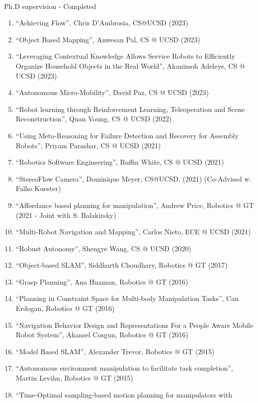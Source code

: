 \documentclass{article}
\begin{document}
\begin{cv}
\begin{cvlist}{~}
\item[Ph.D supervision - Completed]\ \\
  \begin{enumerate}
    \item ``Achieving Flow'', Chris D'Ambrosia, CS@UCSD (2023)
    \item ``Object Based Mapping'', Anwesan Pal, CS @ UCSD (2023)
    \item ``Leveraging Contextual Knowledge Allows Service Robots to
          Efficiently Organize Household Objects in the Real World'', Akanimoh Adeleye, CS @ UCSD (2023)
    \item ``Autonomous Micro-Mobility'', David Paz, CS @ UCSD (2023)
    \item ``Robot learning through Reinforcement Learning, Teleoperation
        and Scene Reconstruction'', Quan Voung, CS @ UCSD (2022)
    \item ``Using Meta-Reasoning for Failure Detection and Recovery for
          Assembly Robots'', Priyam Parashar, CS @ UCSD (2021)
    \item ``Robotics Software Engineering'', Ruffin White, CS @ UCSD (2021)
    \item ``StereoFlow Camera'', Dominique Meyer, CS@UCSD, (2021)
          (Co-Advised w. Falko Kuester)
    \item ``Affordance based planning for manipulation'', Andrew Price, Robotics
          @ GT (2021 - Joint with S. Balakirsky)
    \item ``Multi-Robot Navigation and Mapping'', Carlos Nieto, ECE @ UCSD
          (2021)
    \item ``Robust Autonomy'', Shengye Wang, CS @ UCSD (2020)
    \item ``Object-based SLAM'', Siddharth Choudhary, Robotics @ GT (2017)
    \item ``Grasp Planning'', Ana Huaman, Robotics @ GT (2016)
    \item ``Planning in Constraint Space for Multi-body Manipulation Tasks'',
          Can Erdogan, Robotics @ GT (2016)
    \item ``Navigation Behavior Design and Representations For a People Aware
          Mobile Robot System'', Akansel Cosgun, Robotics @ GT (2016)
    \item ``Model Based SLAM'', Alexander Trevor, Robotics @ GT (2015)
    \item ``Autonomous environment manipulation to facilitate task completion'',
          Martin Levihn, Robotics @ GT (2015)
    \item ``Time-Optimal sampling-based motion planning for manipulators with

\end{enumerate}
\end{cvlist}
\end{cv}
\end{document}
